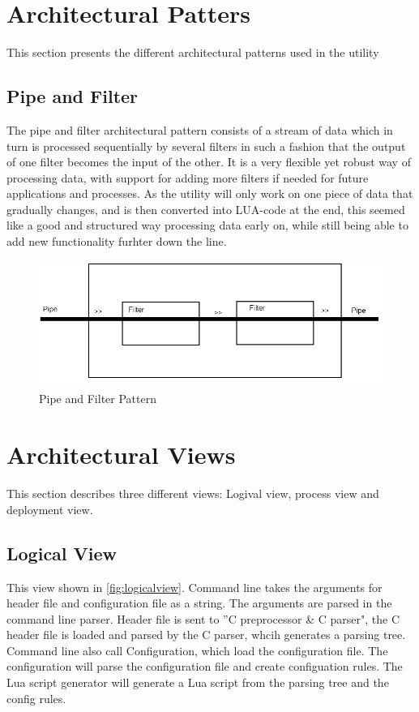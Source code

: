 \section{Architectural Patters}
This section presents the different architectural patterns used in the utility

\subsection{Pipe and Filter}
The pipe and filter architectural pattern consists of a stream of data which in turn is processed sequentially by several filters in such a fashion that the output of one filter becomes the input of the other. It is a very flexible yet robust way of processing data, with support for adding more filters if needed for future applications and processes. As the utility will only work on one piece of data that gradually changes, and is then converted into LUA-code at the end, this seemed like a good and structured way processing data early on, while still being able to add new functionality furhter down the line.

\begin{figure}[htb]
	\includegraphics[width=\textwidth]{./planning/img/PipeAndFilter}
	\caption{Pipe and Filter Pattern\label{fig:pipefilter}}
\end{figure}


\section{Architectural Views}
This section describes three different views: Logival view, process view and deployment view.

\subsection{Logical View}
This view shown in \autoref{fig:logicalview}. Command line takes the arguments for header file and configuration file as a string. The arguments are parsed in the command line parser. Header file is sent to ''C preprocessor \& C parser", the C header file is loaded and parsed by the C parser, whcih generates a parsing tree. Command line also call Configuration, which load the configuration file. The configuration will parse the configuration file and create configuation rules. The Lua script generator will generate a Lua script from the parsing tree and the config rules.

